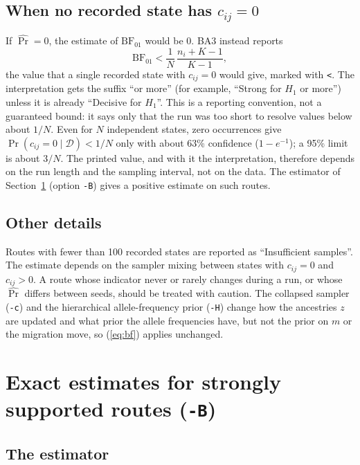 \documentclass[11pt,a4paper]{article}
\newcommand{\BF}{\mathrm{BF}}
\newcommand{\data}{\mathcal{D}}
\newcommand{\1}{\mathbf{1}}
\begin{document}
\subsection{When no recorded state has $c_{ij}=0$}

If $\widehat{\Pr}=0$, the estimate of $\BF_{01}$ would be $0$. BA3 instead
reports
\[
\BF_{01} < \frac{1}{N}\,\frac{n_i+K-1}{K-1},
\]
the value that a single recorded state with $c_{ij}=0$ would give, marked with
\texttt{<}. The interpretation gets the suffix ``or more'' (for example,
``Strong for $H_1$ or more'') unless it is already ``Decisive for $H_1$''. This
is a reporting convention, not a guaranteed bound: it says only that the run
was too short to resolve values below about $1/N$. Even for $N$ independent
states, zero occurrences give $\Pr(c_{ij}=0\mid\data) < 1/N$ only with about
63\% confidence ($1-e^{-1}$); a 95\% limit is about $3/N$. The printed value,
and with it the interpretation, therefore depends on the run length and the
sampling interval, not on the data. The estimator of Section~\ref{sec:exactbf}
(option \texttt{-B}) gives a positive estimate on such routes.

\subsection{Other details}

Routes with fewer than 100 recorded states are reported as ``Insufficient
samples''. The estimate depends on the sampler mixing between states with
$c_{ij}=0$ and $c_{ij}>0$. A route whose indicator never or rarely changes
during a run, or whose $\widehat{\Pr}$ differs between seeds, should be
treated with caution. The collapsed sampler (\texttt{-c}) and the hierarchical
allele-frequency prior (\texttt{-H}) change how the ancestries $z$ are updated
and what prior the allele frequencies have, but not the prior on $m$ or the
migration move, so (\ref{eq:bf}) applies unchanged.

\section{Exact estimates for strongly supported routes (\texttt{-B})}
\label{sec:exactbf}

\subsection{The estimator}
\end{document}
